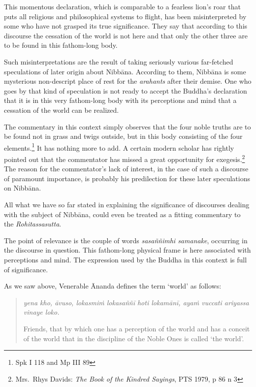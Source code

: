 This momentous declaration, which is comparable to a fearless lion's roar that puts all religious and philosophical systems to flight, has been misinterpreted by some who have not grasped its true significance. They say that according to this discourse the cessation of the world is not here and that only the other three are to be found in this fathom-long body.

Such misinterpretations are the result of taking seriously various far-fetched speculations of later origin about Nibbāna. According to them, Nibbāna is some mysterious non-descript place of rest for the \emph{arahants} after their demise. One who goes by that kind of speculation is not ready to accept the Buddha's declaration that it is in this very fathom-long body with its perceptions and mind that a cessation of the world can be realized.

The commentary in this context simply observes that the four noble truths are to be found not in grass and twigs outside, but in this body consisting of the four elements.\footnote{Spk I 118 and Mp III 89} It has nothing more to add. A certain modern scholar has rightly pointed out that the commentator has missed a great opportunity for exegesis.\footnote{Mrs.~Rhys Davids: \emph{The Book of the Kindred Sayings}, PTS 1979, p 86 n 3} The reason for the commentator's lack of interest, in the case of such a discourse of paramount importance, is probably his predilection for these later speculations on Nibbāna.

All what we have so far stated in explaining the significance of discourses dealing with the subject of Nibbāna, could even be treated as a fitting commentary to the \emph{Rohitassasutta}.

The point of relevance is the couple of words \emph{sasaññimhi samanake}, occurring in the discourse in question. This fathom-long physical frame is here associated with perceptions and mind. The expression used by the Buddha in this context is full of significance.

As we saw above, Venerable Ānanda defines the term `world' as follows:

\begin{quote}
\emph{yena kho, āvuso, lokasmiṁ lokasaññī hoti lokamānī, ayaṁ vuccati ariyassa vinaye loko.}

Friends, that by which one has a perception of the world and has a conceit of the world that in the discipline of the Noble Ones is called `the world'.
\end{quote}

